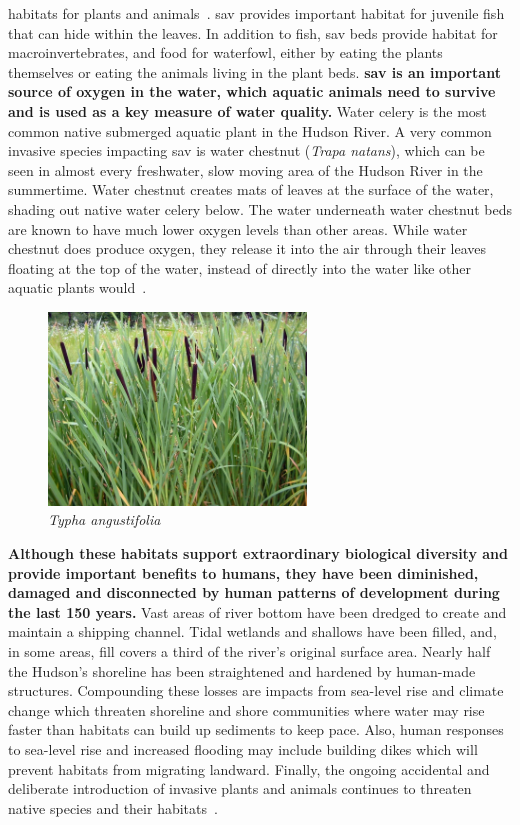 habitats for plants and animals~\citep{nysdectidal}. 
\gls{sav} provides important habitat for juvenile fish that can hide within the
leaves. In addition to fish, \gls{sav} beds provide habitat for
macroinvertebrates, and food for waterfowl, either by eating the plants
themselves or eating the animals living in the plant beds. \textbf{\gls{sav} is
an important source of oxygen in the water, which aquatic animals need to
survive and is used as a key measure of water quality.} Water celery is the
most common native submerged aquatic plant in the Hudson River. A very common
invasive species impacting \gls{sav} is water chestnut (\textit{Trapa natans}),
which can be seen in almost every freshwater, slow moving area of the Hudson
River in the summertime. Water chestnut creates mats of leaves at the surface
of the water, shading out native water celery below. The water underneath water
chestnut beds are known to have much lower oxygen levels than other areas.
While water chestnut does produce oxygen, they release it into the air through
their leaves floating at the top of the water, instead of directly into the
water like other aquatic plants would~\citep{nysdecsav}.
\begin{figure}
    \includegraphics[width=6.85cm,keepaspectratio]{images/Cattail.jpg}
    \caption{\textit{Typha angustifolia}}
\end{figure}

\textbf{Although these habitats support extraordinary biological diversity and
provide important benefits to humans, they have been diminished, damaged and
disconnected by human patterns of development during the last 150 years.} Vast
areas of river bottom have been dredged to create and maintain a shipping
channel. Tidal wetlands and shallows have been filled, and, in some areas, fill
covers a third of the river's original surface area. Nearly half the Hudson's
shoreline has been straightened and hardened by human-made structures.
Compounding these losses are impacts from sea-level rise and climate change
which threaten shoreline and shore communities where water may rise faster than
habitats can build up sediments to keep pace. Also, human responses to
sea-level rise and increased flooding may include building dikes which will
prevent habitats from migrating landward. Finally, the ongoing accidental and
deliberate introduction of invasive plants and animals continues to threaten
native species and their habitats~\citep{nysdosmoodna, anderson2013}.


